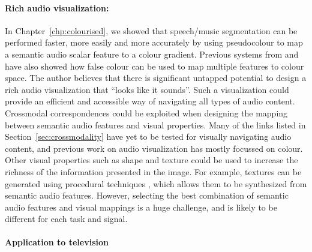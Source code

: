 \paragraph{Rich audio visualization:}

In Chapter~\ref{chp:colourised}, we showed that speech/music segmentation can be performed faster, more easily and more
accurately by using pseudocolour to map a semantic audio scalar feature to a colour gradient. Previous systems from
\citet{Tzanetakis2000} and \citet{Mason2007} have also showed how false colour can be used to map multiple features to
colour space.  The author believes that there is significant untapped potential to design a rich audio visualization
that ``looks like it sounds''. Such a visualization could provide an efficient and accessible way of navigating all
types of audio content.  Crossmodal correspondences could be exploited when designing the mapping between semantic
audio features and visual properties.  Many of the links listed in Section~\ref{sec:crossmodality} have yet to be
tested for visually navigating audio content, and previous work on audio visualization has mostly focussed on colour.
Other visual properties such as shape and texture could be used to increase the richness of the information presented
in the image.  For example, textures can be generated using procedural techniques \citep{Ebert1994}, which allows them
to be synthesized from semantic audio features.  However, selecting the best combination of semantic audio features and
visual mappings is a huge challenge, and is likely to be different for each task and signal.



\paragraph{Application to television}

